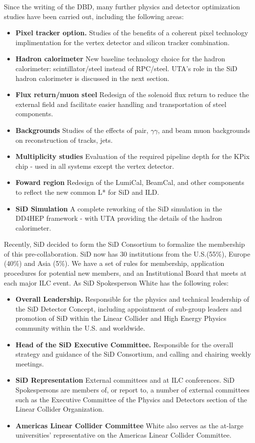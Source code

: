Since the writing of the DBD, many further physics and detector optimization studies have been carried
out, including the following areas:
\begin{itemize} [noitemsep,nolistsep]
\item {\bf Pixel tracker option.} Studies of the benefits of a coherent pixel technology implimentation for the
vertex detector and silicon tracker combination.
\item {\bf Hadron calorimeter} New baseline technology choice for the hadron calorimeter: scintillator/steel instead of RPC/steel.
UTA's role in the SiD hadron calorimeter is discussed in the next section.
\item {\bf Flux return/muon steel} Redesign of the solenoid flux return to reduce the external field and facilitate easier handling
and transportation of steel components. 
\item {\bf Backgrounds} Studies of the effects of pair, $ \gamma\gamma $, and beam muon backgrounds on reconstruction of tracks, jets.
\item {\bf Multiplicity studies} Evaluation of the required pipeline depth for the KPix chip - used in all systems except the vertex
 detector.
 \item {\bf Foward region} Redesign of the LumiCal, BeamCal, and other components to reflect the new common L* for SiD and ILD.
 \item{\bf SiD Simulation} A complete reworking of the SiD simulation in the DD4HEP framework - with UTA providing the details
 of the hadron calorimeter.
 \end{itemize}
 
Recently, SiD decided to form the SiD Consortium to formalize the membership of this pre-collaboration.
SiD now has 30 institutions from the U.S.(55\%), Europe (40\%) and Asia (5\%).
We have a set of rules for membership, application procedures for potential new members, and an Institutional
Board that meets at each major ILC event. As SiD Spokesperson White has the following roles:

\begin{itemize} [noitemsep,nolistsep]
\item {\bf Overall Leadership.} Responsible for the physics and technical leadership of the SiD Detector 
Concept, including appointment of sub-group leaders and promotion of SiD within the Linear Collider 
and High Energy Physics community within the U.S. and worldwide.
\item {\bf Head of the SiD Executive Committee.} Responsible for the overall strategy and guidance of 
the SiD Consortium, and calling and chairing weekly meetings.
\item {\bf SiD Representation} External committees and at ILC conferences. SiD Spokespersons are members of, 
or report to, a number of external committees such as the Executive Committee of the Physics and Detectors section of the 
Linear Collider Organization.
\item{\bf Americas Linear Collider Committee} White also serves as the at-large universities' representative on the 
Americas Linear Collider Committee.
\end{itemize}

